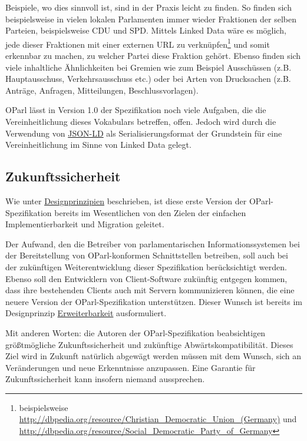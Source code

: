 \documentclass[,a4paper]{article}
\begin{document}
Beispiele, wo dies sinnvoll ist, sind in der Praxis leicht zu finden. So
finden sich beispielsweise in vielen lokalen Parlamenten immer wieder
Fraktionen der selben Parteien, beispielsweise CDU und SPD. Mittels
Linked Data wäre es möglich, jede dieser Fraktionen mit einer externen
URL zu verknüpfen\footnote{beispielsweise
  \url{http://dbpedia.org/resource/Christian_Democratic_Union_(Germany)}
  und
  \url{http://dbpedia.org/resource/Social_Democratic_Party_of_Germany}}
und somit erkennbar zu machen, zu welcher Partei diese Fraktion gehört.
Ebenso finden sich viele inhaltliche Ähnlichkeiten bei Gremien wie zum
Beispiel Ausschüssen (z.B. Hauptausschuss, Verkehrsausschuss etc.) oder
bei Arten von Drucksachen (z.B. Anträge, Anfragen, Mitteilungen,
Beschlussvorlagen).

OParl lässt in Version 1.0 der Spezifikation noch viele Aufgaben, die
die Vereinheitlichung dieses Vokabulars betreffen, offen. Jedoch wird
durch die Verwendung von \hyperref[jsonld]{JSON-LD} als
Serialisierungsformat der Grundstein für eine Vereinheitlichung im Sinne
von Linked Data gelegt.

\subsection{Zukunftssicherheit}\label{zukunftssicherheit}

Wie unter \hyperref[designprinzipien]{Designprinzipien} beschrieben, ist
diese erste Version der OParl-Spezifikation bereits im Wesentlichen von
den Zielen der einfachen Implementierbarkeit und Migration geleitet.

Der Aufwand, den die Betreiber von parlamentarischen
Informationssystemen bei der Bereitstellung von OParl-konformen
Schnittstellen betreiben, soll auch bei der zukünftigen
Weiterentwicklung dieser Spezifikation berücksichtigt werden. Ebenso
soll den Entwicklern von Client-Software zukünftig entgegen kommen, dass
ihre bestehenden Clients auch mit Servern kommunizieren können, die eine
neuere Version der OParl-Spezifikation unterstützen. Dieser Wunsch ist
bereits im Designprinzip \hyperref[erweiterbarkeit]{Erweiterbarkeit}
ausformuliert.

Mit anderen Worten: die Autoren der OParl-Spezifikation beabsichtigen
größtmögliche Zukunftssicherheit und zukünftige Abwärtskompatibilität.
Dieses Ziel wird in Zukunft natürlich abgewägt werden müssen mit dem
Wunsch, sich an Veränderungen und neue Erkenntnisse anzupassen. Eine
Garantie für Zukunftssicherheit kann insofern niemand aussprechen.
\end{document}
